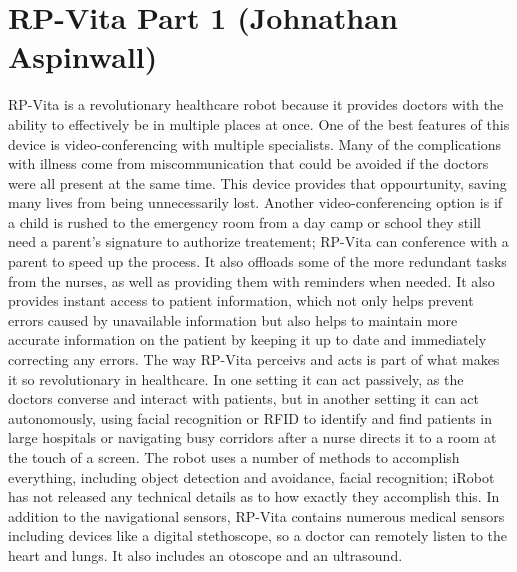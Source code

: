 \documentclass[11pt,conference]{IEEEtran}
\begin{document}
\section{RP-Vita Part 1 (Johnathan Aspinwall)}

RP-Vita is a revolutionary healthcare robot because it provides doctors with the ability to effectively be in multiple places at once. One of the best features of this device is video-conferencing with multiple specialists. Many of the complications with illness come from miscommunication that could be avoided if the doctors were all present at the same time. This device provides that oppourtunity, saving many lives from being unnecessarily lost. Another video-conferencing option is if a child is rushed to the emergency room from a day camp or school they still need a parent's signature to authorize treatement; RP-Vita can conference with a parent to speed up the process. It also offloads some of the more redundant tasks from the nurses, as well as providing them with reminders when needed. It also provides instant access to patient information, which not only helps prevent errors caused by unavailable information but also helps to maintain more accurate information on the patient by keeping it up to date and immediately correcting any errors.
\newline
\indent The way RP-Vita perceivs and acts is part of what makes it so revolutionary in healthcare. In one setting it can act passively, as the doctors converse and interact with patients, but in another setting it can act autonomously, using facial recognition or RFID to identify and find patients in large hospitals or navigating busy corridors after a nurse directs it to a room at the touch of a screen. The robot uses a number of methods to accomplish everything, including object detection and avoidance, facial recognition; iRobot has not released any technical details as to how exactly they accomplish this. In addition to the navigational sensors, RP-Vita contains numerous medical sensors including devices like a digital stethoscope, so a doctor can remotely listen to the heart and lungs. It also includes an otoscope and an ultrasound.
\end{document}
